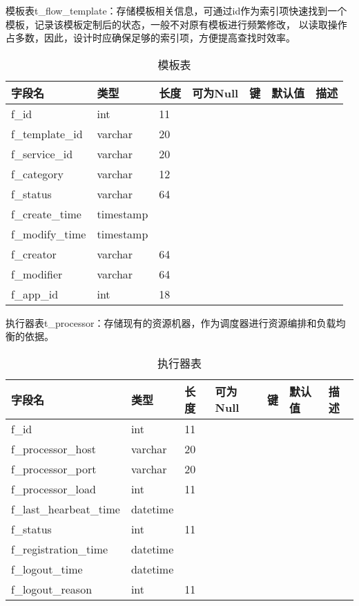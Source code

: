 模板表t\_flow\_template：存储模板相关信息，可通过id作为索引项快速找到一个模板，记录该模板定制后的状态，一般不对原有模板进行频繁修改，
以读取操作占多数，因此，设计时应确保足够的索引项，方便提高查找时效率。
\begin{table}[H]
    \centering
    \caption{模板表}
    \label{tab:t_flow_template}
    \begin{tabular}{lllllll}
        \toprule
        字段名	&类型	&长度	&可为Null	&键	&默认值	&描述 \\
        \midrule
        f\_id	&int	&11 &&&& \\
        f\_template\_id	&varchar	&20 &&&& \\
        f\_service\_id	&varchar	&20 &&&& \\
        f\_category	&varchar	&12 &&&& \\
        f\_status	&varchar	&64 &&&& \\
        f\_create\_time	&timestamp & &&&& \\
        f\_modify\_time   &timestamp & &&&& \\
        f\_creator	&varchar	&64 &&&& \\
        f\_modifier	&varchar	&64 &&&& \\
        f\_app\_id	&int	&18 &&&& \\
        \bottomrule
    \end{tabular}
\end{table}

执行器表t\_processor：存储现有的资源机器，作为调度器进行资源编排和负载均衡的依据。
\begin{table}[H]
    \centering
    \caption{执行器表}
    \label{tab:t_processor}
    \begin{tabular}{lllllll}
        \toprule
        字段名	&类型	&长度	&可为Null	&键	&默认值	&描述 \\
        \midrule
        f\_id	&int	&11 &&&& \\
        f\_processor\_host	&varchar	&20 &&&& \\
        f\_processor\_port	&varchar	&20 &&&& \\
        f\_processor\_load	&int	&11 &&&& \\
        f\_last\_hearbeat\_time	&datetime & &&&& \\
        f\_status	&int	&11 &&&& \\
        f\_registration\_time	&datetime & &&&& \\
        f\_logout\_time	&datetime & &&&& \\
        f\_logout\_reason	&int	&11 &&&& \\
        \bottomrule
    \end{tabular}
\end{table}


